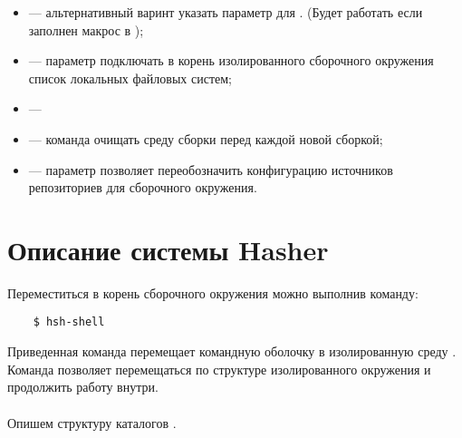 \begin{itemize}
	\item {} --- альтернативный варинт указать параметр  для .
	(Будет работать если заполнен макрос   в );
	\item {} --- параметр подключать в корень изолированного сборочного
	окружения список локальных файловых систем;
	\item {} ---
	\item {} --- команда очищать среду сборки перед каждой новой сборкой;
	\item {} --- параметр позволяет переобозначить конфигурацию источников
	репозиториев для сборочного окружения.
\end{itemize}

\section{Описание системы Hasher}
Переместиться в корень сборочного окружения можно выполнив команду:
\begin{verbatim}
	$ hsh-shell
\end{verbatim}
Приведенная команда перемещает командную оболочку в изолированную среду .
Команда позволяет перемещаться по структуре изолированного окружения и продолжить работу
внутри.\\
\\
Опишем структуру каталогов .

